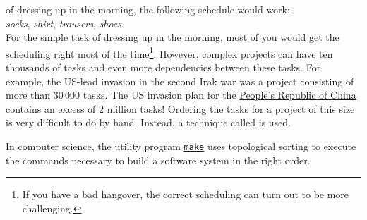 of dressing up in the morning, the following schedule would work:
\\[0.2cm]
\hspace*{1.3cm}
\textsl{socks}, \textsl{shirt}, \textsl{trousers}, \textsl{shoes}.
\\[0.2cm]
For the simple task of dressing up in the morning, most of you would get the scheduling right most of the
time\footnote{If you have a bad hangover, the correct scheduling can turn out to be more challenging.}.
However, complex projects can have ten thousands of tasks and even more dependencies between these tasks.  For
example, the US-lead invasion in the second Irak war was a project consisting of more than $30\,000$ tasks.
The US invasion plan for the \href{https://en.wikipedia.org/wiki/China}{People's Republic of China} 
contains an excess of 2 million tasks!  Ordering the tasks for a project of this size is very difficult to do by
hand.  Instead, a technique called  is used. 

In computer science, the utility program \href{https://edoras.sdsu.edu/doc/make.html}{\texttt{make}} uses
topological sorting to execute the commands necessary to build a software system in the right order.

